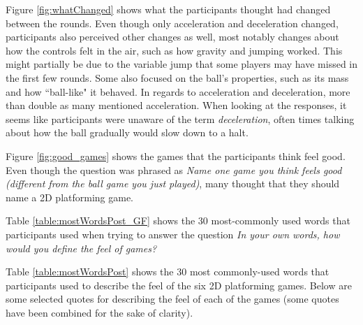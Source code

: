 Figure \ref{fig:whatChanged} shows what the participants thought had changed between the rounds. Even though only acceleration and deceleration changed, participants also perceived other changes as well, most notably changes about how the controls felt in the air, such as how gravity and jumping worked. This might partially be due to the variable jump that some players may have missed in the first few rounds. Some also focused on the ball's properties, such as its mass and how ``ball-like" it behaved. In regards to acceleration and deceleration, more than double as many mentioned acceleration. When looking at the responses, it seems like participants were unaware of the term \textit{deceleration}, often times talking about how the ball gradually would slow down to a halt.

Figure \ref{fig:good_games} shows the games that the participants think feel good. Even though the question was phrased as \textit{Name one game you think feels good (different from the ball game you just played)}, many thought that they should name a 2D platforming game.

Table \ref{table:mostWordsPost_GF} shows the 30 most-commonly used words that participants used when trying to answer the question \textit{In your own words, how would you define the feel of games?}

Table \ref{table:mostWordsPost} shows the 30 most commonly-used words that participants used to describe the feel of the six 2D platforming games. Below are some selected quotes for describing the feel of each of the games (some quotes have been combined for the sake of clarity).

